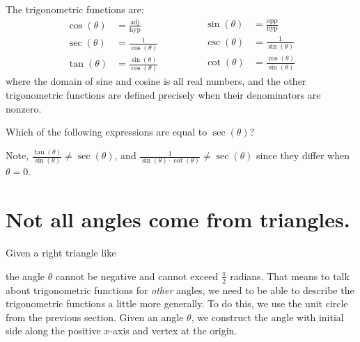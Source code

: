 \documentclass{ximera}
\begin{document}
\begin{definition}
  The trigonometric functions are:
  \[
  \begin{aligned}
  \cos(\theta) &= \frac{\text{adj}}{\text{hyp}}\\
  \sec(\theta) &= \frac{1}{\cos(\theta)}\\
  \tan(\theta) &= \frac{\sin(\theta)}{\cos(\theta)}\qquad
  \end{aligned}
  \qquad
  \begin{aligned}
  \sin(\theta) &= \frac{\text{opp}}{\text{hyp}}\\
  \csc(\theta) &= \frac{1}{\sin(\theta)}\\
  \cot(\theta) &= \frac{\cos(\theta)}{\sin(\theta)}    
  \end{aligned}
  \]
  where the domain of sine and cosine is all real numbers, and the
  other trigonometric functions are defined precisely when their
  denominators are nonzero.
\end{definition}

\begin{question}
  Which of the following expressions are equal to $\sec(\theta)$?
  \begin{selectAll}
    \choice{$\frac{\tan(\theta)}{\sin(\theta)}$}
  \end{selectAll}
  \begin{feedback}
    Note, $\frac{\tan(\theta)}{\sin(\theta)}\ne \sec(\theta)$, and
    $\frac{1}{\sin(\theta)\cdot\cot(\theta)}\ne \sec(\theta)$ since
    they differ when $\theta =0$.
  \end{feedback}
\end{question}

\section{Not all angles come from triangles.}
Given a right triangle like
\begin{image}[2in]
\end{image}
the angle $\theta$ cannot be negative and cannot exceed $\frac{\pi}{2}$ radians.  That means to talk about trigonometric functions for \emph{other} angles, we need to be able
to describe the trigonometric functions a little more generally.  To do this, we use the unit circle from the previous section.  Given an angle $\theta$,
we construct the angle with initial side along the positive $x$-axis and vertex at the origin.
\end{document}
